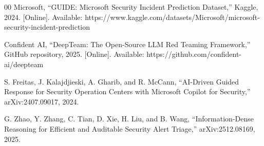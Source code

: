\documentclass[conference]{IEEEtran}
\begin{document}
\begin{thebibliography}{00}
 Microsoft, ``GUIDE: Microsoft Security Incident Prediction Dataset,'' Kaggle,
2024. [Online]. Available:
https://www.kaggle.com/datasets/Microsoft/microsoft-security-incident-prediction

 Confident AI, ``DeepTeam: The Open-Source LLM Red Teaming Framework,''
GitHub repository, 2025. [Online]. Available: https://github.com/confident-ai/deepteam

 S. Freitas, J. Kalajdjieski, A. Gharib, and R. McCann, ``AI-Driven
Guided Response for Security Operation Centers with Microsoft Copilot for Security,''
arXiv:2407.09017, 2024.

 G. Zhao, Y. Zhang, C. Tian, D. Xie, H. Liu, and B. Wang,
``Information-Dense Reasoning for Efficient and Auditable Security Alert Triage,''
arXiv:2512.08169, 2025.

\end{thebibliography}
\end{document}

